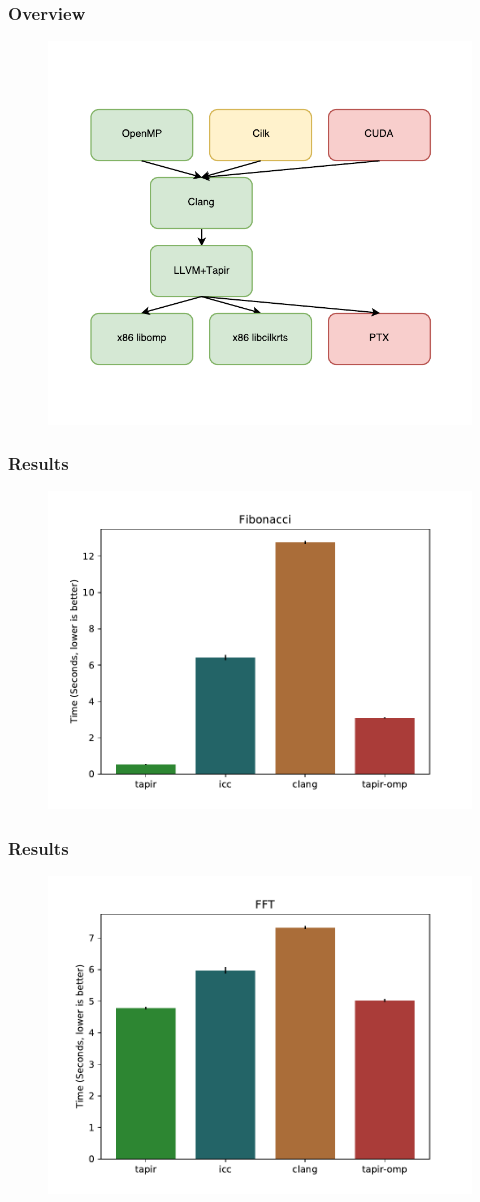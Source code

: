 \documentclass{beamer}
\begin{document}
\begin{frame}[fragile]
\frametitle{Overview}
\begin{figure}
\vspace{-1cm}
\includegraphics[width=0.6\linewidth]{tapir-io}
\end{figure}
\end{frame}

\begin{frame}[fragile]
\frametitle{Results}
\begin{figure}
\includegraphics[width=0.7\linewidth]{fib}
\end{figure}
\end{frame}

\begin{frame}[fragile]
\frametitle{Results}
\begin{figure}
\includegraphics[width=0.7\linewidth]{fft}
\end{figure}
\end{frame}
\end{document}
